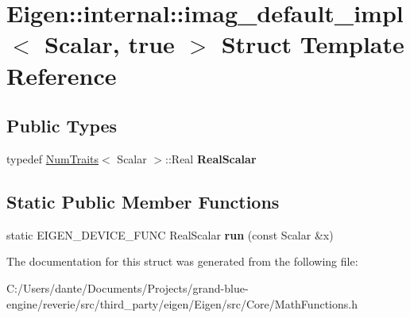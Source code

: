 \hypertarget{struct_eigen_1_1internal_1_1imag__default__impl_3_01_scalar_00_01true_01_4}{}\section{Eigen\+::internal\+::imag\+\_\+default\+\_\+impl$<$ Scalar, true $>$ Struct Template Reference}
\label{struct_eigen_1_1internal_1_1imag__default__impl_3_01_scalar_00_01true_01_4}
\subsection*{Public Types}
\begin{DoxyCompactItemize}
\item 
\mbox{\label{struct_eigen_1_1internal_1_1imag__default__impl_3_01_scalar_00_01true_01_4_aacba501bf33c7e58599be5f2b046ab18}} 
typedef \mbox{\hyperlink{struct_eigen_1_1_num_traits}{Num\+Traits}}$<$ Scalar $>$\+::Real {\bfseries Real\+Scalar}
\end{DoxyCompactItemize}
\subsection*{Static Public Member Functions}
\begin{DoxyCompactItemize}
\item 
\mbox{\label{struct_eigen_1_1internal_1_1imag__default__impl_3_01_scalar_00_01true_01_4_a6ff639ddfc4e2c81e1d2ee4a0a8aff79}} 
static E\+I\+G\+E\+N\+\_\+\+D\+E\+V\+I\+C\+E\+\_\+\+F\+U\+NC Real\+Scalar {\bfseries run} (const Scalar \&x)
\end{DoxyCompactItemize}


The documentation for this struct was generated from the following file\+:\begin{DoxyCompactItemize}
\item 
C\+:/\+Users/dante/\+Documents/\+Projects/grand-\/blue-\/engine/reverie/src/third\+\_\+party/eigen/\+Eigen/src/\+Core/Math\+Functions.\+h\end{DoxyCompactItemize}
